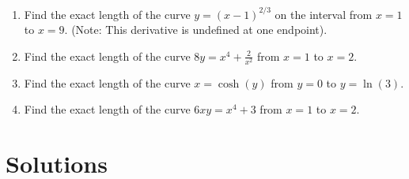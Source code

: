 \documentclass{article}
\begin{document}
\begin{enumerate}
    \item Find the exact length of the curve $y = (x-1)^{2/3}$ on the interval from $x=1$ to $x=9$. (Note: This derivative is undefined at one endpoint).
    
    \item Find the exact length of the curve $8y = x^4 + \frac{2}{x^2}$ from $x=1$ to $x=2$.
    
    \item Find the exact length of the curve $x = \cosh(y)$ from $y=0$ to $y=\ln(3)$.
    
    \item Find the exact length of the curve $6xy = x^4 + 3$ from $x=1$ to $x=2$.

\end{enumerate}

\section*{Solutions}
\end{document}
